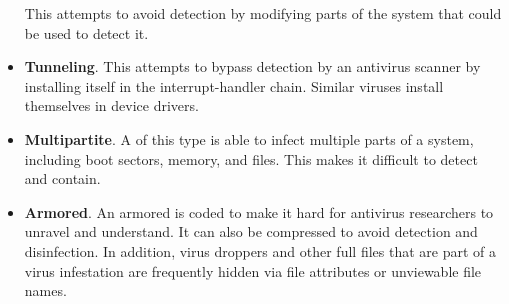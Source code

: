 \begin{itemize}[noitemsep]
  This  attempts to avoid detection by modifying parts of the system that could be used to detect it.
\item \textbf{Tunneling}.
  This  attempts to bypass detection by an antivirus scanner by installing itself in the interrupt-handler chain.
  Similar viruses install themselves in device drivers.
\item \textbf{Multipartite}.
  A  of this type is able to infect multiple parts of a system, including boot sectors, memory, and files.
  This makes it difficult to detect and contain.
\item \textbf{Armored}.
  An armored  is coded to make it hard for antivirus researchers to unravel and understand.
  It can also be compressed to avoid detection and disinfection.
  In addition, virus droppers and other full files that are part of a virus infestation are frequently hidden via file attributes or unviewable file names.
\end{itemize}

